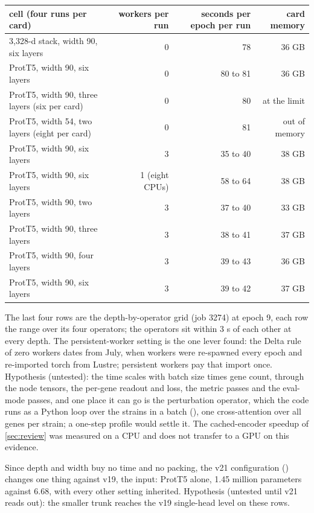 \begin{center}\footnotesize
\begin{tabular}{@{}lrrr@{}}
\toprule
cell (four runs per card) & workers per run & seconds per epoch per run & card memory \\
\midrule
3{,}328-d stack, width 90, six layers & 0 & 78 & 36 GB \\
ProtT5, width 90, six layers & 0 & 80 to 81 & 36 GB \\
ProtT5, width 90, three layers (six per card) & 0 & 80 & at the limit \\
ProtT5, width 54, two layers (eight per card) & 0 & 81 & out of memory \\
ProtT5, width 90, six layers & 3 & 35 to 40 & 38 GB \\
ProtT5, width 90, six layers & 1 (eight CPUs) & 58 to 64 & 38 GB \\
ProtT5, width 90, two layers & 3 & 37 to 40 & 33 GB \\
ProtT5, width 90, three layers & 3 & 38 to 41 & 37 GB \\
ProtT5, width 90, four layers & 3 & 39 to 43 & 36 GB \\
ProtT5, width 90, six layers & 3 & 39 to 42 & 37 GB \\
\bottomrule
\end{tabular}
\end{center}

The last four rows are the depth-by-operator grid (job 3274) at epoch 9, each row the range
over its four operators; the operators sit within 3 s of each other at every depth. The
persistent-worker setting is the one lever found: the Delta rule of zero workers dates from
July, when workers were re-spawned every epoch and re-imported torch from Lustre; persistent
workers pay that import once. Hypothesis (untested): the time scales with batch size times
gene count, through the node tensors, the per-gene readout and loss, the metric passes and
the eval-mode passes, and one place it can go is the perturbation operator, which the code
runs as a Python loop over the strains in a batch
(), one cross-attention
over all genes per strain; a one-step profile would settle it. The cached-encoder speedup of
\cref{sec:review} was measured on a CPU and does not transfer to a GPU on this evidence.

 Since
depth and width buy no time and no packing, the v21 configuration
() changes one thing against v19, the input: ProtT5
alone, 1.45 million parameters against 6.68, with every other setting inherited. Hypothesis
(untested until v21 reads out): the smaller trunk reaches the v19 single-head level on these
rows.

